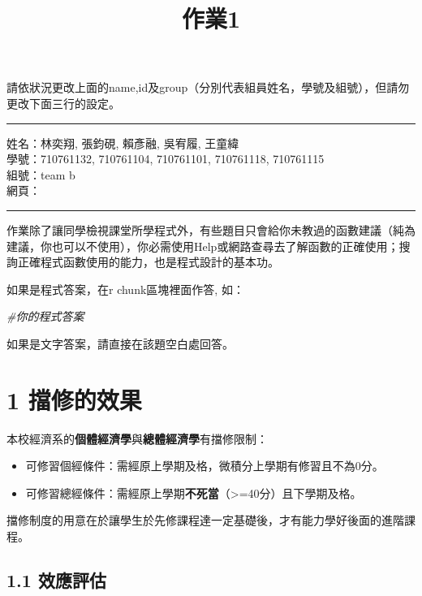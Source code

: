 \documentclass[]{article}
\title{作業1}
\author{}
\date{}
\newenvironment{Shaded}{\begin{snugshade}}{\end{snugshade}}
\newcommand{\CommentTok}[1]{\textcolor[rgb]{0.56,0.35,0.01}{\textit{#1}}}
\begin{document}
\maketitle

{
\setcounter{tocdepth}{1}
\tableofcontents
}
請依狀況更改上面的name,id及group（分別代表組員姓名，學號及組號），但請勿更改下面三行的設定。

\begin{center}\rule{0.5\linewidth}{\linethickness}\end{center}

姓名：林奕翔, 張鈞硯, 賴彥融, 吳宥履, 王童緯\\
學號：710761132, 710761104, 710761101, 710761118, 710761115\\
組號：team b\\
網頁：

\begin{center}\rule{0.5\linewidth}{\linethickness}\end{center}

作業除了讓同學檢視課堂所學程式外，有些題目只會給你未教過的函數建議（純為建議，你也可以不使用），你必需使用Help或網路查尋去了解函數的正確使用；搜詢正確程式函數使用的能力，也是程式設計的基本功。

如果是程式答案，在r chunk區塊裡面作答, 如：

\begin{Shaded}
\begin{Highlighting}[]
\CommentTok{#你的程式答案}
\end{Highlighting}
\end{Shaded}

如果是文字答案，請直接在該題空白處回答。

\section{1 擋修的效果}

本校經濟系的\textbf{個體經濟學}與\textbf{總體經濟學}有擋修限制：

\begin{itemize}
\item
  可修習個經條件：需經原上學期及格，微積分上學期有修習且不為0分。
\item
  可修習總經條件：需經原上學期\textbf{不死當}（\textgreater{}=40分）且下學期及格。
\end{itemize}

擋修制度的用意在於讓學生於先修課程達一定基礎後，才有能力學好後面的進階課程。

\subsection{1.1 效應評估}
\end{document}
